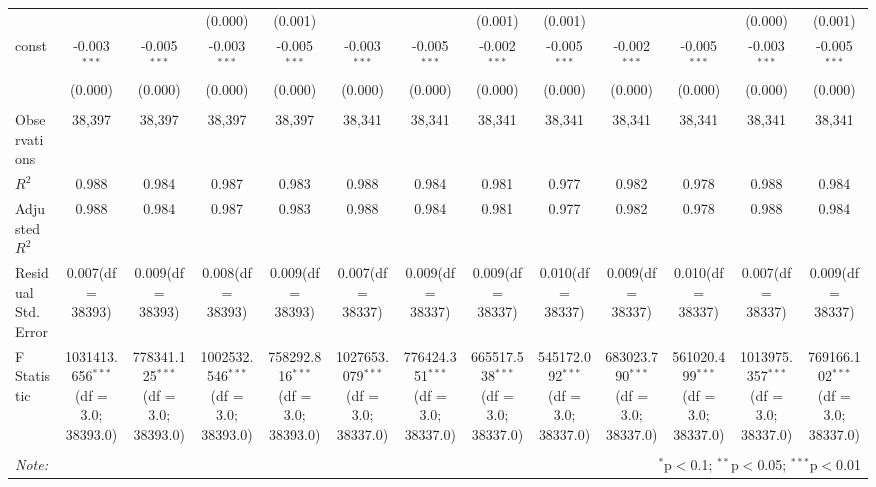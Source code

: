 \begin{table}[!htbp]
\begin{tabular}{@{\extracolsep{5pt}}lcccccccccccc}
  & & & (0.000) & (0.001) & & & (0.001) & (0.001) & & & (0.000) & (0.001) \\
 const & -0.003$^{***}$ & -0.005$^{***}$ & -0.003$^{***}$ & -0.005$^{***}$ & -0.003$^{***}$ & -0.005$^{***}$ & -0.002$^{***}$ & -0.005$^{***}$ & -0.002$^{***}$ & -0.005$^{***}$ & -0.003$^{***}$ & -0.005$^{***}$ \\
  & (0.000) & (0.000) & (0.000) & (0.000) & (0.000) & (0.000) & (0.000) & (0.000) & (0.000) & (0.000) & (0.000) & (0.000) \\
\hline \\[-1.8ex]
 Observations & 38,397 & 38,397 & 38,397 & 38,397 & 38,341 & 38,341 & 38,341 & 38,341 & 38,341 & 38,341 & 38,341 & 38,341 \\
 $R^2$ & 0.988 & 0.984 & 0.987 & 0.983 & 0.988 & 0.984 & 0.981 & 0.977 & 0.982 & 0.978 & 0.988 & 0.984 \\
 Adjusted $R^2$ & 0.988 & 0.984 & 0.987 & 0.983 & 0.988 & 0.984 & 0.981 & 0.977 & 0.982 & 0.978 & 0.988 & 0.984 \\
 Residual Std. Error & 0.007(df = 38393) & 0.009(df = 38393) & 0.008(df = 38393) & 0.009(df = 38393) & 0.007(df = 38337) & 0.009(df = 38337) & 0.009(df = 38337) & 0.010(df = 38337) & 0.009(df = 38337) & 0.010(df = 38337) & 0.007(df = 38337) & 0.009(df = 38337)  \\
 F Statistic & 1031413.656$^{***}$ (df = 3.0; 38393.0) & 778341.125$^{***}$ (df = 3.0; 38393.0) & 1002532.546$^{***}$ (df = 3.0; 38393.0) & 758292.816$^{***}$ (df = 3.0; 38393.0) & 1027653.079$^{***}$ (df = 3.0; 38337.0) & 776424.351$^{***}$ (df = 3.0; 38337.0) & 665517.538$^{***}$ (df = 3.0; 38337.0) & 545172.092$^{***}$ (df = 3.0; 38337.0) & 683023.790$^{***}$ (df = 3.0; 38337.0) & 561020.499$^{***}$ (df = 3.0; 38337.0) & 1013975.357$^{***}$ (df = 3.0; 38337.0) & 769166.102$^{***}$ (df = 3.0; 38337.0) \\
\hline
\hline \\[-1.8ex]
\textit{Note:} & \multicolumn{12}{r}{$^{*}$p$<$0.1; $^{**}$p$<$0.05; $^{***}$p$<$0.01} \\
\end{tabular}
\end{table}